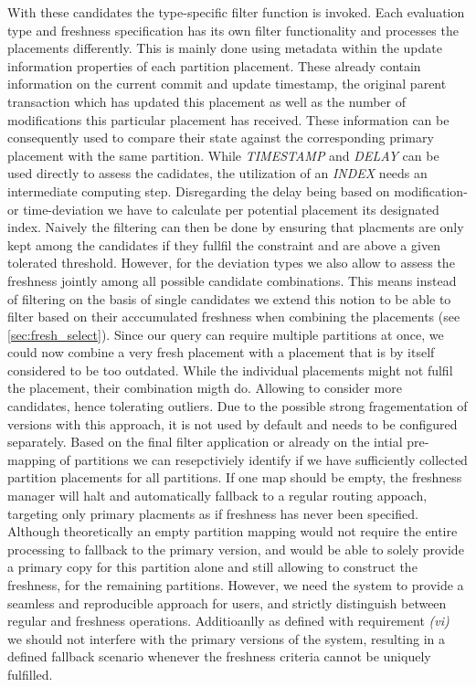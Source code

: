 With these candidates the type-specific filter function is invoked. Each evaluation type and freshness specification has its own filter functionality and
processes the placements differently. This is mainly done using metadata within the update information properties of each partition placement. 
These already contain information on the current commit and update timestamp,
the original parent transaction which has updated this placement as well as the number of modifications this particular placement has received.
These information can be consequently used to compare their state against the corresponding primary placement with the same partition. 
While \emph{TIMESTAMP} and \emph{DELAY} can be used directly to assess the cadidates, the utilization of an \emph{INDEX} needs an intermediate computing step.
Disregarding the delay being based on modification- or time-deviation we have to calculate per potential placement its designated index.
Naively the filtering can then be done by ensuring that placments are only kept among the candidates if they fullfil the constraint and are above 
a given tolerated threshold. However, for the deviation types we also allow to assess the freshness jointly among all possible candidate combinations.
This means instead of filtering on the basis of single candidates we extend this notion to be able to filter based on their acccumulated freshness when combining the placements
(see \ref{sec:fresh_select}).
Since our query can require multiple partitions at once, we could now combine a very fresh placement with a placement that is by itself considered to be too outdated.
While the individual placements might not fulfil the placement, their combination migth do. Allowing to consider more candidates, hence tolerating outliers.
Due to the possible strong fragementation of versions with this approach, it is not used by default and needs to be configured separately.
Based on the final filter application or already on the intial pre-mapping of partitions we can resepctiviely identify if we have sufficiently collected partition placements 
for all partitions. If one map should be empty, the freshness manager will halt and automatically fallback to a regular routing appoach, targeting only primary placments 
as if freshness has never been specified. \\
Although theoretically an empty partition mapping would not require the entire processing to fallback to the primary version, and 
would be able to solely provide a primary copy for this partition alone and still allowing to construct the freshness, 
for the remaining partitions. 
However, we need the system to provide a seamless and reproducible approach for users, and strictly distinguish between regular and freshness operations. 
Additioanlly as defined with requirement \textit{(vi)} we should not interfere with the primary versions of the system, resulting in a defined fallback scenario whenever the freshness
criteria cannot be uniquely fulfilled.



